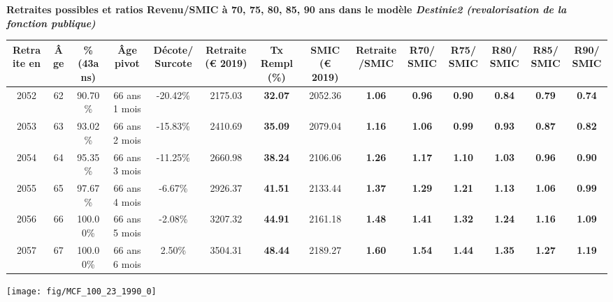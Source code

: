  \vspace{0.1cm} 
{\bf \noindent Retraites possibles et ratios Revenu/SMIC à 70, 75, 80, 85, 90 ans dans le modèle \emph{Destinie2 (revalorisation de la fonction publique)}}  
 
\begin{adjustbox}{max width=\textwidth} 
\begin{tabular}[htb]{|c|c||c|c|c||c|c||c|c||c|c|c|c|c|} 
\hline 
 Retraite en &  Âge &  \%(43ans) &  Âge pivot &  Décote/Surcote &  Retraite (\euro{} 2019) &  Tx Rempl(\%) &  SMIC (\euro{} 2019) &  Retraite/SMIC &  R70/SMIC &  R75/SMIC &  R80/SMIC &  R85/SMIC &  R90/SMIC \\ 
\hline \hline 
 2052 &  62 &  90.70\% &  66 ans 1 mois &  -20.42\% &  2175.03 &  {\bf 32.07} &  2052.36 &  {\bf 1.06} &  {\bf {\color{red} 0.96}} &  {\bf {\color{red} 0.90}} &  {\bf {\color{red} 0.84}} &  {\bf {\color{red} 0.79}} &  {\bf {\color{red} 0.74}} \\ 
\hline 
 2053 &  63 &  93.02\% &  66 ans 2 mois &  -15.83\% &  2410.69 &  {\bf 35.09} &  2079.04 &  {\bf 1.16} &  {\bf 1.06} &  {\bf {\color{red} 0.99}} &  {\bf {\color{red} 0.93}} &  {\bf {\color{red} 0.87}} &  {\bf {\color{red} 0.82}} \\ 
\hline 
 2054 &  64 &  95.35\% &  66 ans 3 mois &  -11.25\% &  2660.98 &  {\bf 38.24} &  2106.06 &  {\bf 1.26} &  {\bf 1.17} &  {\bf 1.10} &  {\bf 1.03} &  {\bf {\color{red} 0.96}} &  {\bf {\color{red} 0.90}} \\ 
\hline 
 2055 &  65 &  97.67\% &  66 ans 4 mois &  -6.67\% &  2926.37 &  {\bf 41.51} &  2133.44 &  {\bf 1.37} &  {\bf 1.29} &  {\bf 1.21} &  {\bf 1.13} &  {\bf 1.06} &  {\bf {\color{red} 0.99}} \\ 
\hline 
 2056 &  66 &  100.00\% &  66 ans 5 mois &  -2.08\% &  3207.32 &  {\bf 44.91} &  2161.18 &  {\bf 1.48} &  {\bf 1.41} &  {\bf 1.32} &  {\bf 1.24} &  {\bf 1.16} &  {\bf 1.09} \\ 
\hline 
 2057 &  67 &  100.00\% &  66 ans 6 mois &  2.50\% &  3504.31 &  {\bf 48.44} &  2189.27 &  {\bf 1.60} &  {\bf 1.54} &  {\bf 1.44} &  {\bf 1.35} &  {\bf 1.27} &  {\bf 1.19} \\ 
\hline 
\hline 
\end{tabular} 
\end{adjustbox} 
 
 \vspace{0.1cm} 

 {\hspace{-2.2cm}\texttt{[image: fig/MCF\_100\_23\_1990\_0]}} 

